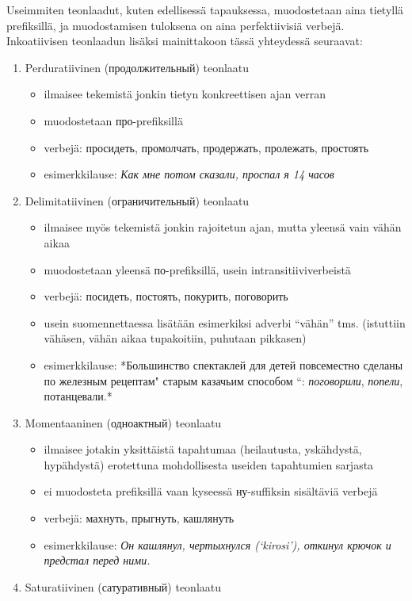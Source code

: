 \documentclass[]{scrreprt}
\providecommand{\tightlist}{%
  \setlength{\itemsep}{0pt}\setlength{\parskip}{0pt}}
\begin{document}
Useimmiten teonlaadut, kuten edellisessä tapauksessa, muodostetaan aina
tietyllä prefiksillä, ja muodostamisen tuloksena on aina perfektiivisiä
verbejä. Inkoatiivisen teonlaadun lisäksi mainittakoon tässä yhteydessä
seuraavat:

\begin{enumerate}
\def\labelenumi{\arabic{enumi}.}
\tightlist
\item
  Perduratiivinen (продолжительный) teonlaatu

  \begin{itemize}
  \tightlist
  \item
    ilmaisee tekemistä jonkin tietyn konkreettisen ajan verran
  \item
    muodostetaan про-prefiksillä
  \item
    verbejä: просидеть, промолчать, продержать, пролежать, простоять
  \item
    esimerkkilause: \emph{Как мне потом сказали, проспал я 14 часов}
  \end{itemize}
\item
  Delimitatiivinen (ограничительный) teonlaatu

  \begin{itemize}
  \tightlist
  \item
    ilmaisee myös tekemistä jonkin rajoitetun ajan, mutta yleensä vain
    vähän aikaa
  \item
    muodostetaan yleensä по-prefiksillä, usein intransitiiviverbeistä
  \item
    verbejä: посидеть, постоять, покурить, поговорить
  \item
    usein suomennettaessa lisätään esimerkiksi adverbi ``vähän'' tms.
    (istuttiin vähäsen, vähän aikaa tupakoitiin, puhutaan pikkasen)
  \item
    esimerkkilause: *Большинство спектаклей для детей повсеместно
    сделаны по железным рецептам" старым казачьим способом ``:
    \emph{поговорили}, \emph{попели}, потанцевали.*
  \end{itemize}
\item
  Momentaaninen (одноактный) teonlaatu

  \begin{itemize}
  \tightlist
  \item
    ilmaisee jotakin yksittäistä tapahtumaa (heilautusta, yskähdystä,
    hypähdystä) erotettuna mohdollisesta useiden tapahtumien sarjasta
  \item
    ei muodosteta prefiksillä vaan kyseessä ну-suffiksin sisältäviä
    verbejä
  \item
    verbejä: махнуть, прыгнуть, кашлянуть
  \item
    esimerkkilause: \emph{Он кашлянул, чертыхнулся (`kirosi'), откинул
    крючок и предстал перед ними.}
  \end{itemize}
\item
  Saturatiivinen (сатуративный) teonlaatu


\end{enumerate}
\end{document}
